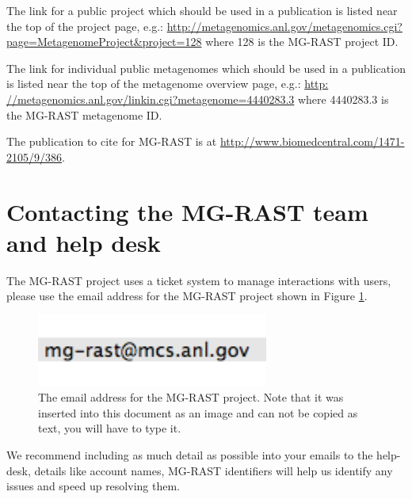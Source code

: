 \documentclass[12pt,fullpage]{report}
\begin{document}
The link for a public project which should be used in a publication is listed near the top of the project page, e.g.:
\url{http://metagenomics.anl.gov/metagenomics.cgi?page=MetagenomeProject&project=128}
where 128 is the MG-RAST project ID.

The link for individual public metagenomes which should be used in a publication is listed near the top of the metagenome overview page, e.g.:
\url{http: //metagenomics.anl.gov/linkin.cgi?metagenome=4440283.3}
where 4440283.3 is the MG-RAST metagenome ID.

The publication to cite for MG-RAST is at \url{http://www.biomedcentral.com/1471-2105/9/386}.
\section{Contacting the MG-RAST team and help desk}
\label{section:contact-mgrast}

The MG-RAST project uses a ticket system to manage interactions with users, please use the email address for the MG-RAST project shown in Figure \ref{fig:mgrastemail}.

\begin{figure}
\begin{center}
\includegraphics[width=3in]{Images/mgrastemail.png}
\end{center}
\caption{
The email address for the MG-RAST project. Note that it was inserted into this document as an image and can not be copied as text, you will have to type it.
}
\label{fig:mgrastemail}
\end{figure}

We recommend including as much detail as possible into your emails to the help-desk, details like account names, MG-RAST identifiers will help us identify any issues and speed up resolving them. 
\end{document}
